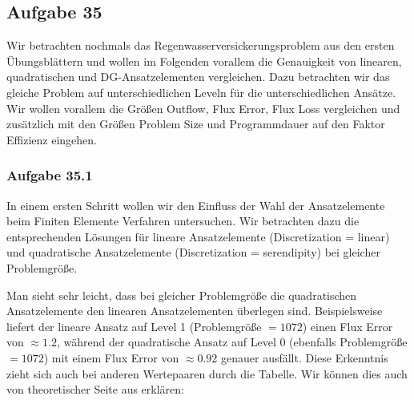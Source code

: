 \subsection{Aufgabe 35}
Wir betrachten nochmals das Regenwasserversickerungsproblem aus den ersten Übungsblättern und wollen im Folgenden vorallem die Genauigkeit von linearen, quadratischen und DG-Ansatzelementen
vergleichen. Dazu betrachten wir das gleiche Problem auf unterschiedlichen Leveln für die unterschiedlichen Ansätze. Wir  wollen vorallem die Größen Outflow, Flux Error, Flux Loss vergleichen und zusätzlich mit den Größen Problem Size und Programmdauer auf den Faktor Effizienz eingehen.

\subsubsection{Aufgabe 35.1}
In einem ersten Schritt wollen wir den Einfluss der Wahl der Ansatzelemente beim Finiten Elemente Verfahren untersuchen.
Wir betrachten dazu die entsprechenden Lösungen für lineare Ansatzelemente (Discretization = linear) und quadratische Ansatzelemente (Discretization = serendipity) bei gleicher Problemgröße.
\begin{figure}[H]
	\centering
\end{figure}

\begin{figure}[H]
	\centering
\end{figure}
Man sieht sehr leicht, dass bei gleicher Problemgröße die quadratischen Ansatzelemente den linearen Ansatzelementen überlegen sind. Beispielsweise liefert der lineare Ansatz auf Level 1 (Problemgröße $= 1072$) einen Flux Error von $\approx 1.2$, während der quadratische Ansatz auf Level 0 (ebenfalls Problemgröße $= 1072$) mit einem Flux Error von $\approx 0.92$ genauer ausfällt. Diese Erkenntnis zieht sich auch bei anderen Wertepaaren durch die Tabelle.
Wir können dies auch von theoretischer Seite aus erklären:

